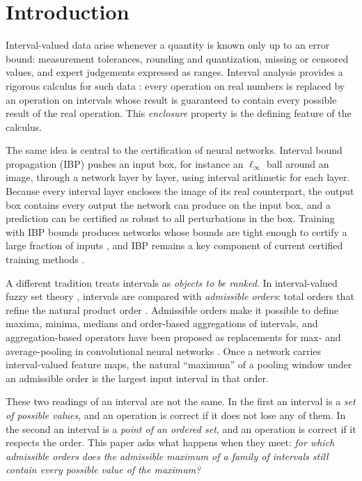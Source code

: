 \tableofcontents

\section{Introduction}
\label{sec:intro}

Interval-valued data arise whenever a quantity is known only up to an error bound: measurement tolerances, rounding and quantization, missing or censored values, and expert judgements expressed as ranges. Interval analysis provides a rigorous calculus for such data \cite{moore2009,rump1999}: every operation on real numbers is replaced by an operation on intervals whose result is guaranteed to contain every possible result of the real operation. This \emph{enclosure} property is the defining feature of the calculus.

The same idea is central to the certification of neural networks. Interval bound propagation (IBP) \cite{mirman2018,gowal2018} pushes an input box, for instance an $\ell_\infty$ ball around an image, through a network layer by layer, using interval arithmetic for each layer. Because every interval layer encloses the image of its real counterpart, the output box contains every output the network can produce on the input box, and a prediction can be certified as robust to all perturbations in the box. Training with IBP bounds produces networks whose bounds are tight enough to certify a large fraction of inputs \cite{gowal2018,zhang2020crownibp,shi2021,mao2024}, and IBP remains a key component of current certified training methods \cite{muller2023sabr,depalma2024,mao2024ctbench}.

A different tradition treats intervals as \emph{objects to be ranked}. In interval-valued fuzzy set theory \cite{zadeh1975}, intervals are compared with \emph{admissible orders}: total orders that refine the natural product order \cite{bustince2013orders,bustince2013choquet}. Admissible orders make it possible to define maxima, minima, medians and order-based aggregations of intervals, and aggregation-based operators have been proposed as replacements for max- and average-pooling in convolutional neural networks \cite{rodriguez2022,rodriguez2023,forcen2020}. Once a network carries interval-valued feature maps, the natural ``maximum'' of a pooling window under an admissible order is the largest input interval in that order.

These two readings of an interval are not the same. In the first an interval is a \emph{set of possible values}, and an operation is correct if it does not lose any of them. In the second an interval is a \emph{point of an ordered set}, and an operation is correct if it respects the order. This paper asks what happens when they meet: \emph{for which admissible orders does the admissible maximum of a family of intervals still contain every possible value of the maximum?}

